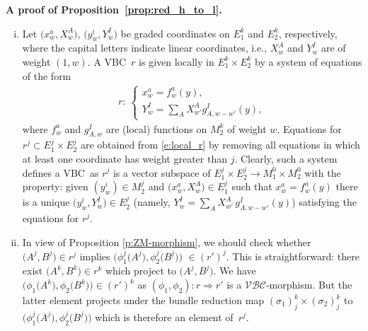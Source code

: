 \documentclass[10pt,a4paper]{amsart}
\newcommand{\ZM}{{VBC}} %
\newcommand{\ra}{\rightarrow}
\newcommand{\mZM}{\Rightarrow}
\newcommand{\catZM}{{\mathcal{VBC}}} %
\numberwithin{equation}{section}
\theoremstyle{definition}
\begin{document}
{\bf A proof of Proposition~\ref{prop:red_h_to_l}.}%
\begin{enumerate}[(i)]\itemsep=0pt
\item Let $\big(x^a_{w}, X^A_{w}\big)$, $\big(y^i_{w}, Y^I_{w}\big)$ be graded coordinates on $E_1^k$ and $E_2^k$, respectively, where the capital letters indicate linear coordinates, i.e., $X^A_{w}$ and $Y^I_{w}$ are of weight $(1, w)$. A \ZM\ $r$ is given locally in $E_1^k \times E_2^k$ by a system of equations of the form
\begin{gather}\label{e:local_r}
r\colon \
\begin{cases}
x^a_{w} = f^a_{w}(y), \\
Y^I_{w} = \sum_A X^A_{w'} g_{A, w-w'}^I(y),
\end{cases}
\end{gather}
where $f^a_{w}$ and $g_{A, w}^I$ are (local) functions on $M_2^k$ of weight $w$. Equations for $r^{j} \subset E_1^j\times E_2^j$ are obtained from \eqref{e:local_r} by removing all equations in which at least one coordinate has weight greater than $j$. Clearly, such a system defines a \ZM\ as $r^j$ is a vector subspace of $E_1^j\times E_2^j \ra M_1^0\times M_2^0$ with the property: given $(y^i_{w})\in M_2^j$ and $\big(x_{w}^a, X_{w}^A\big) \in E_1^j$ such that $x^a_{w} = f^a_{w}(y)$ there is a unique $\big(y^i_{w}, Y^I_{w}\big) \in E_2^j$ (namely, $Y^I_{w}=\sum_A X^A_{w'} \, g_{A, w-w'}^I(y)$) satisfying the equations for $r^j$.

\item In view of Proposition \ref{p:ZM-morphism}, we should check whether $\big(A^j, B^j\big)\in r^j$ implies $\big(\phi_1^j\big(A^j\big), \phi_2^j\big(B^j\big)\big)$ $\in (r')^j$. This is straightforward: there exist $\big(A^k, B^k\big) \in r^k$ which project to $\big(A^j, B^j\big)$. We have $\big(\phi_1\big(A^k\big), \phi_2\big(B^k\big)\big) \in (r')^k$ as $(\phi_1, \phi_2)\colon r \mZM r'$ is a $\catZM$-morphism. But the latter element projects under the bundle reduction map $(\sigma_1)^k_j \times (\sigma_2)^k_j$ to $\big(\phi_1^j\big(A^j\big), \phi_2^j\big(B^j\big)\big)$ which is therefore an element of~$r^j$. %
\end{enumerate}
\end{document}

